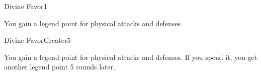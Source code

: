 \begin{spellsection}{Divine Favor}{1}
\begin{spellheader}
    \spelldur \durshort
\end{spellheader}
\begin{spellcontent}
    \begin{spelltargetinginfo}
    \end{spelltargetinginfo}
    \begin{spelleffects}
        \spelleffect You gain a legend point for physical attacks and defenses.
        \spelldur \durshort \dismissable
    \end{spelleffects}
\end{spellcontent}
\begin{spellfooter}
\end{spellfooter}
\end{spellsection}

\begin{spellsection}{Divine Favor}{Greater}{5}
\begin{spellheader}
\end{spellheader}
\begin{spellcontent}
    \begin{spelltargetinginfo}
    \end{spelltargetinginfo}
    \begin{spelleffects}
        \spelleffect You gain a legend point for physical attacks and defenses. If you spend it, you get another legend point 5 rounds later.
        \spelldur \durlong \dismissable
    \end{spelleffects}
\end{spellcontent}
\begin{spellfooter}
\end{spellfooter}
\end{spellsection}

